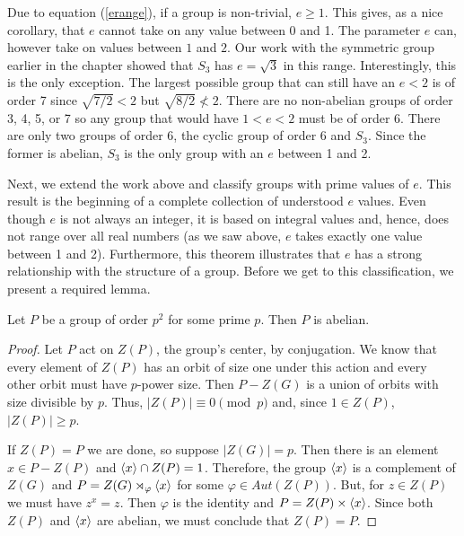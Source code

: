 \documentclass[main.tex]{subfiles}
\begin{document}
Due to equation (\ref{erange}), if a group is non-trivial, $e \ge 1$. This gives, as a nice corollary, that $e$ cannot take on any value between 0 and 1. The parameter $e$ can, however take on values between $1$ and $2$. Our work with the symmetric group earlier in the chapter showed that $S_3$ has $e = \sqrt{3}$ in this range. Interestingly, this is the only exception. The largest possible group that can still have an $e < 2$ is of order 7 since $\sqrt{7/2} < 2$ but $\sqrt{8/2} \not< 2$. There are no non-abelian groups of order 3, 4, 5, or 7 \cite{smallgroups} so any group that would have $1 < e < 2$ must be of order 6. There are only two groups of order 6, the cyclic group of order 6 and $S_3$. Since the former is abelian, $S_3$ is the only group with an $e$ between 1 and 2.

\hss

Next, we extend the work above and classify groups with prime values of $e$. This result is the beginning of a complete collection of understood $e$ values. Even though $e$ is not always an integer, it is based on integral values and, hence, does not range over all real numbers (as we saw above, $e$ takes exactly one value between 1 and 2). Furthermore, this theorem illustrates that $e$ has a strong relationship with the structure of a group. Before we get to this classification, we present a required lemma.

\begin{lemma}\label{psquared}
Let $P$ be a group of order $p^2$ for some prime $p$. Then $P$ is abelian.
\end{lemma}

\begin{proof}
Let $P$ act on $Z(P)$, the group's center, by conjugation. We know that every element of $Z(P)$ has an orbit of size one under this action and every other orbit must have $p$-power size. Then $P - Z(G)$ is a union of orbits with size divisible by $p$. Thus, $|Z(P)| \equiv 0 \pmod{p}$ and, since $1 \in Z(P)$, $|Z(P)| \ge p$. 

If $Z(P) = P$ we are done, so suppose $|Z(G)| = p$. Then there is an element $x \in P - Z(P)$ and $\langle x \rangle \cap Z(P) = 1$. Therefore, the group $\langle x \rangle$ is  a complement of $Z(G)$ and $P = Z(G) \rtimes_\varphi \langle x \rangle$ for some $\varphi \in Aut(Z(P))$. But, for $z \in Z(P)$ we must have $z^x = z$. Then $\varphi$ is the identity and $P = Z(P) \times \langle x \rangle$. Since both $Z(P)$ and $\langle x \rangle$ are abelian, we must conclude that $Z(P) = P$.
\end{proof}
\end{document}
